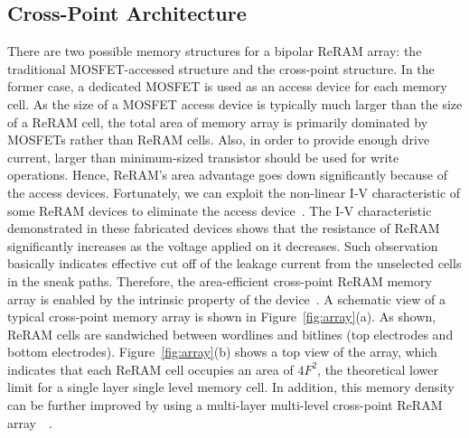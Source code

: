 \subsection{Cross-Point Architecture}
There are two possible memory structures for a bipolar ReRAM array: 
the traditional MOSFET-accessed structure and the
cross-point structure. In the former case, a dedicated MOSFET is
used as an access device for each memory cell. As the size of a MOSFET
access device is typically much larger than the size of a ReRAM cell, the
total area of memory array is primarily dominated by MOSFETs rather than
ReRAM cells. Also, in order to provide enough drive current, larger than
minimum-sized transistor should be used for write operations. Hence,
ReRAM's area advantage goes down significantly because of the access devices.
Fortunately, we can exploit the non-linear I-V characteristic of some 
ReRAM devices to eliminate the access device~\cite{memristor:switch,memristor:Unity}. 
The I-V characteristic
demonstrated in these fabricated devices shows that the resistance of
ReRAM significantly increases as the voltage applied on it decreases. Such
observation basically indicates effective cut off of the leakage current
from the unselected cells in the sneak paths. Therefore, the
area-efficient cross-point ReRAM memory array is enabled by the intrinsic
property of the device~\cite{memristor:Cong}. A schematic view of a
typical cross-point memory array is shown in Figure~\ref{fig:array}(a). As
shown, ReRAM cells are sandwiched between wordlines and bitlines (top
electrodes and bottom electrodes). Figure~\ref{fig:array}(b) shows a top
view of the array, which indicates that each ReRAM cell occupies an area
of $4F^2$, the theoretical lower limit for a single layer single level
memory cell. In addition, this memory density can be further improved by
using a multi-layer multi-level cross-point ReRAM
array~\cite{crossbar_unity}~\cite{memristor:IEDM08_3D}.

